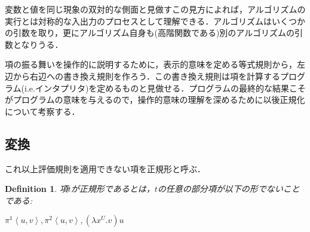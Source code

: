 \documentclass[a4paper,10pt,platex, dvipdfmx]{jsarticle}
\newtheorem{definition}{Definition}
\begin{document}
変数と値を同じ現象の双対的な側面と見做すこの見方によれば，アルゴリズムの実行とは対称的な入出力のプロセスとして理解できる．アルゴリズムはいくつかの引数を取り，更にアルゴリズム自身も(高階関数である)別のアルゴリズムの引数となりうる．

項の振る舞いを操作的に説明するために，表示的意味を定める等式規則から，左辺から右辺への書き換え規則を作ろう．この書き換え規則は項を計算するプログラム(i.e.インタプリタ)を定めるものと見做せる．プログラムの最終的な結果こそがプログラムの意味を与えるので，操作的意味の理解を深めるために以後正規化について考察する．

\subsection{変換}
これ以上評価規則を適用できない項を正規形と呼ぶ．
 \begin{definition}
 項$t$が正規形であるとは，$t$の任意の部分項が以下の形でないことである:
 
 $\pi^{1}\left<u, v\right>, \pi^{2}\left<u, v\right>, (\lambda x^{U}.v)u$
 \end{definition}
\end{document}
